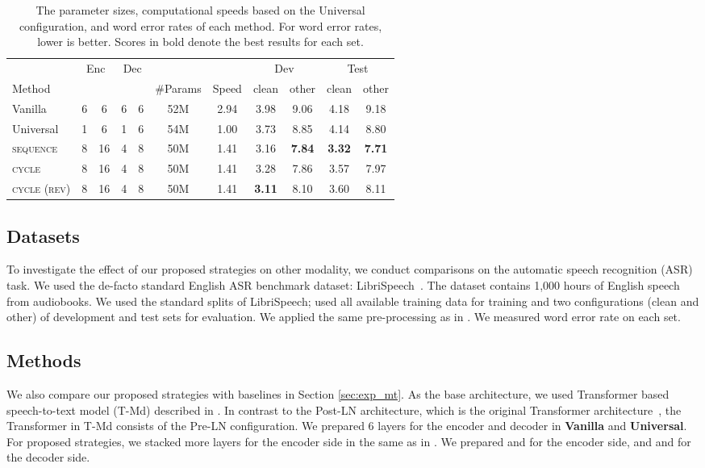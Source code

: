 \documentclass[11pt]{article}
\begin{document}
\begin{table*}[!t]
  \centering{}
\begin{tabular}{ l | c c c c | c | c | c c c c } \hline
         & \multicolumn{2}{c}{Enc} & \multicolumn{2}{c|}{Dec} & &  & \multicolumn{2}{c}{Dev} & \multicolumn{2}{c}{Test} \\
  Method &  &  &  &  & \#Params & Speed & clean & other & clean & other \\ \hline \hline
Vanilla & 6  & 6 & 6 & 6 & 52M & 2.94& 3.98 & 9.06 & 4.18 & 9.18 \\
  Universal & 1 & 6 & 1 & 6 & 54M & 1.00 & 3.73 & 8.85 & 4.14 & 8.80 \\ 
  \textsc{sequence} & 8 & 16 & 4 & 8 & 50M & 1.41 & 3.16 & \textbf{7.84} & \textbf{3.32} & \textbf{7.71}\\
  \textsc{cycle} & 8 & 16 & 4 & 8 & 50M & 1.41 & 3.28 & 7.86 & 3.57 & 7.97 \\
  \textsc{cycle (rev)} & 8 & 16 & 4 & 8 & 50M & 1.41 & \textbf{3.11} & 8.10 & 3.60 & 8.11\\ \hline
  \end{tabular}
  \caption{The parameter sizes, computational speeds based on the Universal configuration, and word error rates of each method. For word error rates, lower is better. Scores in bold denote the best results for each set.\label{tab:exp_asr}}
\end{table*}

\subsection{Datasets}
To investigate the effect of our proposed strategies on other modality, we conduct comparisons on the automatic speech recognition (ASR) task.
We used the de-facto standard English ASR benchmark dataset: LibriSpeech~\cite{7178964}.
The dataset contains 1,000 hours of English speech from audiobooks.
We used the standard splits of LibriSpeech; used all available training data for training and two configurations (clean and other) of development and test sets for evaluation.
We applied the same pre-processing as in \cite{wang-etal-2020-fairseq}.
We measured word error rate on each set.

\subsection{Methods}
We also compare our proposed strategies with baselines in Section \ref{sec:exp_mt}.
As the base architecture, we used Transformer based speech-to-text model (T-Md) described in \cite{wang-etal-2020-fairseq}.
In contrast to the Post-LN architecture, which is the original Transformer architecture~\cite{NIPS2017_7181}, the Transformer in T-Md consists of the Pre-LN configuration.
We prepared 6 layers for the encoder and decoder in \textbf{Vanilla} and \textbf{Universal}.
For proposed strategies, we stacked more layers for the encoder side in the same as in \cite{wang-etal-2020-fairseq}.
We prepared  and  for the encoder side, and  and  for the decoder side.
\end{document}
